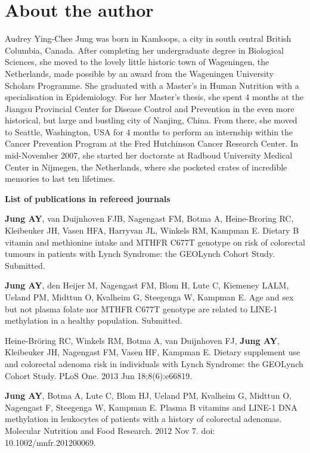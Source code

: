 \chapter*{About the author}
\label{About the author}

\newpage

\noindent Audrey Ying-Chee Jung was born in Kamloops, a city in south central British Columbia, Canada. After completing her undergraduate degree in Biological Sciences, she moved to the lovely little historic town of Wageningen, the Netherlands, made possible by an award from the Wageningen University Scholars Programme. She graduated with a Master's in Human Nutrition with a specialisation in Epidemiology. For her Master's thesis, she spent 4 months at the Jiangsu Provincial Center for Disease Control and Prevention in the even more historical, but large and bustling city of Nanjing, China. From there, she moved to Seattle, Washington, USA for 4 months to perform an internship within the Cancer Prevention Program at the Fred Hutchinson Cancer Research Center. In mid-November 2007, she started her doctorate at Radboud University Medical Center in Nijmegen, the Netherlands, where she pocketed crates of incredible memories to last ten lifetimes.

\newpage
\noindent \textbf{List of publications in refereed journals}

\noindent \textbf{Jung AY}, van Duijnhoven FJB, Nagengast FM, Botma A, Heine-Broring RC, Kleibeuker JH, Vasen HFA, Harryvan JL, Winkels RM, Kampman E. Dietary B vitamin and methionine intake and MTHFR C677T genotype on risk of colorectal tumours in patients with Lynch Syndrome: the GEOLynch Cohort Study. Submitted.

\noindent \textbf{Jung AY}, den Heijer M, Nagengast FM, Blom H, Lute C, Kiemeney LALM, Ueland PM, Midttun O, Kvalheim G, Steegenga W, Kampman E. Age and sex but not plasma folate nor MTHFR C677T genotype are related to LINE-1 methylation in a healthy population. Submitted.

\noindent Heine-Br\"oring RC, Winkels RM, Botma A, van Duijnhoven FJ, \textbf{Jung AY}, Kleibeuker JH, Nagengast FM, Vasen HF, Kampman E. Dietary supplement use and colorectal adenoma risk in individuals with Lynch Syndrome: the GEOLynch Cohort Study. PLoS One. 2013 Jun 18;8(6):e66819.

\noindent \textbf{Jung AY}, Botma A, Lute C, Blom HJ, Ueland PM, Kvalheim G, Midttun O, Nagengast F, Steegenga W, Kampman E. Plasma B vitamins and LINE-1 DNA methylation in leukocytes of patients with a history of colorectal adenomas. Molecular Nutrition and Food Research. 2012 Nov 7. doi: 10.1002/mnfr.201200069.

